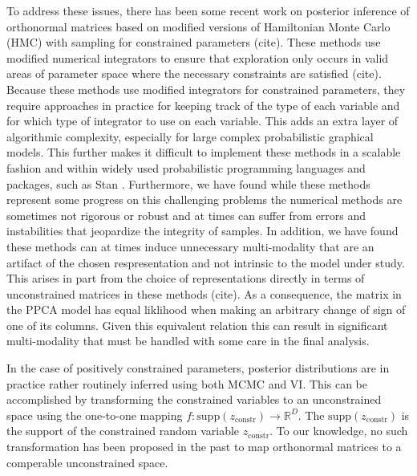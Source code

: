 \documentclass{article}
\begin{document}
To address these issues, there has been some recent work on posterior inference of orthonormal matrices based on modified versions of Hamiltonian Monte Carlo (HMC) with sampling for constrained parameters (cite).  These methods use modified numerical integrators to ensure that exploration only occurs in valid areas of parameter space where the necessary constraints are satisfied (cite).  Because these methods use modified integrators for constrained parameters, they require approaches in practice for keeping track of the type of each variable and for which type of integrator to use on each variable. This adds an extra layer of algorithmic complexity, especially for large complex probabilistic graphical models.  This further makes it difficult to implement these methods in a scalable fashion and within widely used probabilistic programming languages and packages, such as Stan \citep{carpenter2016stan}. Furthermore, we have found while these methods represent some progress on this challenging problems the numerical methods are sometimes not rigorous or robust and at times can suffer from errors and instabilities that jeopardize the integrity of samples.  In addition, we have found these methods can at times induce unnecessary multi-modality that are an artifact of the chosen respresentation and not intrinsic to the model under study.  This arises in part from the choice of representations directly in terms of unconstrained matrices in these methods (cite).  As a consequence, the matrix in the PPCA model has equal liklihood when making an arbitrary change of sign of one of its columns.  Given this equivalent relation this can result in significant multi-modality that must be handled with some care in the final analysis.

In the case of positively constrained parameters, posterior distributions are in practice rather routinely inferred  using both MCMC and VI. This can be accomplished by transforming the constrained variables to an unconstrained space using the one-to-one mapping $f: \mathrm{supp}(z_\mathrm{constr}) \to \mathbb{R}^D$.  The $\mathrm{supp}(z_\mathrm{constr})$ is the support of the constrained random variable $z_\mathrm{constr}$. To our knowledge, no such transformation has been proposed in the past to map orthonormal matrices to a comperable unconstrained space.
\end{document}
